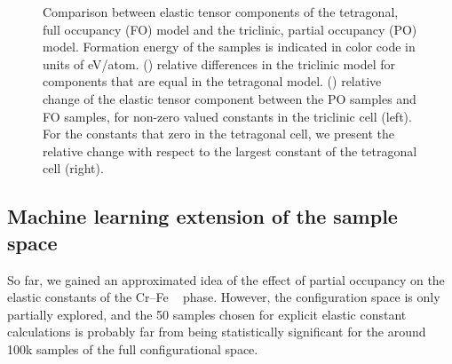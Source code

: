 \documentclass[superscriptaddress, 12pt]{revtex4-2}%
\begin{document}
 \begin{figure}[H]
  \caption{\protect\label{fig:ResultsElasticConstants} 
    Comparison between elastic tensor components of the tetragonal, full occupancy (FO) model and the triclinic,
    partial occupancy (PO) model. 
    Formation energy of the samples is indicated in color code in units of eV/atom.
    () relative differences in the triclinic model for components that are equal in the tetragonal model. 
    () relative change of the elastic tensor component between the PO samples and FO samples, for non-zero valued constants in the triclinic cell (left). 
    For the constants that zero in the tetragonal cell, we present the relative change with respect to the largest constant of the tetragonal cell (right).
  }
\end{figure}

\subsection{Machine learning extension of the sample space}

So far, we gained an approximated idea of the effect of partial occupancy on the elastic constants of the Cr--Fe \textsigma ~ phase.
However, the configuration space is only partially explored, and the 50 samples chosen for explicit elastic constant calculations is probably far from being statistically significant for the around 100k samples of the full configurational space. 
\end{document}
